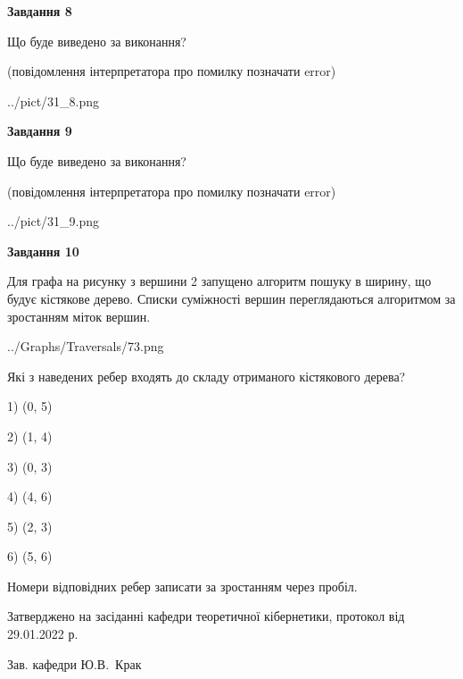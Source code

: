 \documentclass[12pt, ukrainian]{article}
\begin{document}
{\begin {large}
{\begin {center}\textbf{Завдання 8}\end {center}}\par
Що буде виведено за виконання?\par
 (повідомлення інтерпретатора про помилку позначати error)\par
\begin{center}
	{../pict/31_8.png}
\end{center}
\newpage

{\begin {center}\textbf{Завдання 9}\end {center}}\par
Що буде виведено за виконання?\par
 (повідомлення інтерпретатора про помилку позначати error)\par
\begin{center}
	{../pict/31_9.png}
\end{center}
\newpage

{\begin {center}\textbf{Завдання 10}\end {center}}\par
Для графа на рисунку з вершини 2 запущено алгоритм пошуку в ширину, що будує кістякове дерево. Списки суміжності вершин переглядаються алгоритмом за зростанням міток вершин.\par
\begin{center}
	{../Graphs/Traversals/73.png}
\end{center}
\par Які з наведених ребер входять до складу отриманого кістякового дерева?\par
1) (0, 5)\par
2) (1, 4)\par
3) (0, 3)\par
4) (4, 6)\par
5) (2, 3)\par
6) (5, 6)\par
{\vskip 15pt} Номери відповідних ребер записати за зростанням через пробіл.\par
\newpage


\end {large}
}
{\smallskip \begin {small} Затверджено на засіданні кафедри теоретичної кібернетики, протокол  від   29.01.2022 р.\par\smallskip\smallskip
{\parbox {6.5 cm}{Зав. кафедри \dotfill Ю.В.~Крак}} \end{small}}
\end{document}
